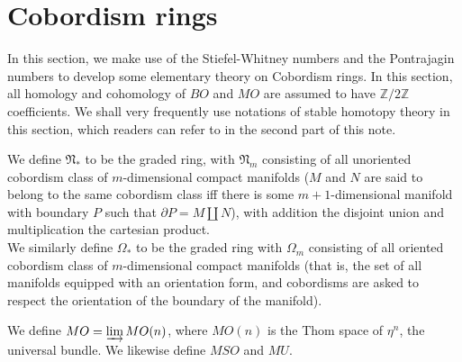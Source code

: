 \section{Cobordism rings}

	In this section, we make use of the Stiefel-Whitney numbers and the Pontrajagin numbers to develop some elementary theory on Cobordism rings. In this section, all homology and cohomology of $BO$ and $MO$ are assumed to have $\mathbb{Z}/2\mathbb{Z}$ coefficients. We shall very frequently use notations of stable homotopy theory in this section, which readers can refer to in the second part of this note. 
	\begin{defn}
		We define $\mathfrak{N}_*$ to be the graded ring, with $\mathfrak{N}_m$ consisting of all unoriented cobordism class of $m$-dimensional compact manifolds ($M$ and $N$ are said to belong to the same cobordism class iff there is some $m+1$-dimensional manifold with boundary $P$ such that $\partial P=M\coprod N$), with addition the disjoint union and multiplication the cartesian product. \\
		We similarly define $\Omega_*$ to be the graded ring with $\Omega_m$ consisting of all oriented cobordism class of $m$-dimensional compact manifolds (that is, the set of all manifolds equipped with an orientation form, and cobordisms are asked to respect the orientation of the boundary of the manifold). 
	\end{defn}
	\begin{defn}
		We define $MO=\varinjlim MO(n)$, where $MO(n)$ is the Thom space of $\eta^n$, the universal bundle. We likewise define $MSO$ and $MU$. 
	\end{defn}

